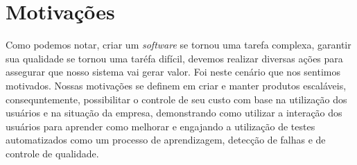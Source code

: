   \section{Motivações}
    Como podemos notar, criar um \textit{software} se tornou uma tarefa complexa,
    garantir sua qualidade se tornou uma taréfa difícil, devemos realizar diversas
    ações para assegurar que nosso sistema vai gerar valor. Foi neste cenário que nos
    sentimos motivados. \newline
    Nossas motivações se definem em criar e manter produtos escaláveis,
    consequntemente, possibilitar o controle de seu custo com base na utilização
    dos usuários e na situação da empresa, demonstrando como utilizar a interação
    dos usuários para aprender como melhorar e engajando a utilização de testes
    automatizados como um processo de aprendizagem, detecção de falhas e de
    controle de qualidade.
